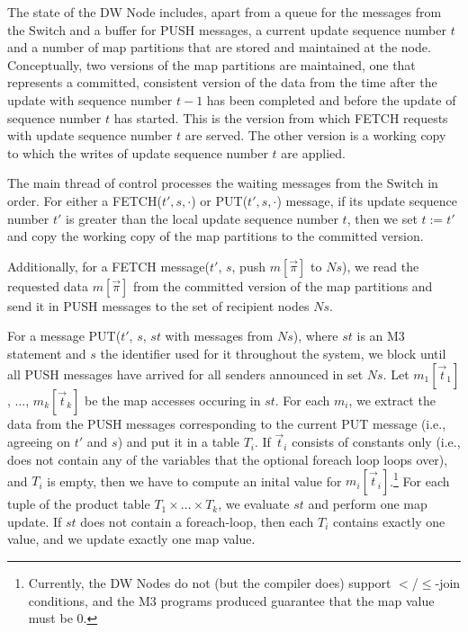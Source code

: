 
The state of the DW Node includes, apart from a queue 
for the messages from the Switch and a buffer for PUSH messages, a
current update sequence number $t$ and a number
of map partitions that are stored and maintained at the node.
Conceptually, two versions of the map partitions are maintained,
one that represents a committed, consistent version of the data from the time after the
update with sequence number $t-1$ has been completed and before the update
of sequence number $t$ has started. This is the version from which FETCH
requests with update sequence number $t$ are served. The other
version is a working copy to which the writes of update sequence number
$t$ are applied.

The main thread of control processes the waiting messages from the Switch
in order.
For either a FETCH($t', s, \cdot$) or PUT($t', s,\cdot$) message, if its
update sequence number $t'$ is greater
than the local update sequence number $t$, then we set $t := t'$
and copy the working copy of the map partitions to the committed version.

Additionally,
for a FETCH message($t'$, $s$, push $m[\vec{\pi}]$ to $\textit{Ns}$),
we read the requested data $m[\vec{\pi}]$ from the committed version of
the map partitions and send it in PUSH messages to the set of recipient
nodes $\textit{Ns}$.

For a message PUT($t'$, $s$, $st$ with messages from $\textit{Ns}$), where $st$
is an M3 statement and $s$ the identifier used for it throughout the 
system, we block until all PUSH messages have arrived for all
senders announced in set $\textit{Ns}$.
Let $m_1[\vec{t}_1]$, $\dots$, $m_k[\vec{t}_k]$ be the map accesses occuring in
$st$. For each $m_i$, 
we extract the data from the PUSH messages corresponding
to the current PUT message (i.e., agreeing on $t'$ and $s$) and put it in a table $T_i$.
If $\vec{t}_i$ consists of constants only (i.e., does not contain any
of the variables that the optional foreach loop loops over), and $T_i$ is
empty, then we have to compute an inital value for
$m_i[\vec{t}_i]$.\footnote{Currently,
the DW Nodes do not (but the compiler does) support $<$/$\le$-join conditions,
and the M3 programs produced guarantee that the map value must be 0.}
For each tuple of the product table $T_1 \times \dots \times T_k$,
we evaluate $st$ and perform one map update.
If $st$ does not contain a foreach-loop, then each $T_i$ contains exactly
one value, and we update exactly one map value.


